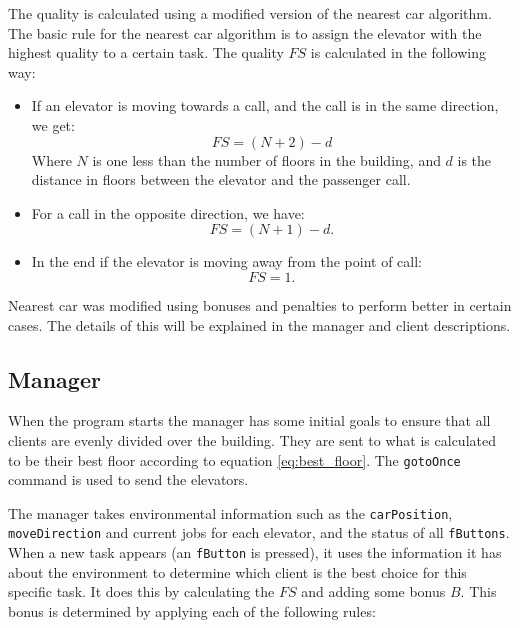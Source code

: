 \documentclass[a4paper,10pt,twocolumn]{article}
\begin{document}
The quality is calculated using a modified version of the nearest car algorithm. The basic rule for the nearest car algorithm is to assign the elevator with the highest quality to a certain task. The quality $FS$ is calculated in the following way:
\begin{itemize}
 \item If an elevator is moving towards a call, and the call is in the same direction, we get:
\begin{equation}
 \label{eq:nearest_car1}
 FS = (N + 2) - d
\end{equation}
 Where $N$ is one less than the number of floors in the building, and $d$ is the distance in floors between the elevator and the passenger call.
 \item For a call in the opposite direction, we have:
\begin{equation}
\label{eq:nearest_car2}
 FS = (N + 1) - d.
\end{equation}
 \item In the end if the elevator is moving away from the point of call: 
 \begin{equation}
 \label{eq:nearest_car3}
  FS = 1.
 \end{equation}
\end{itemize}
Nearest car was modified using bonuses and penalties to perform better in certain cases. The details of this will be explained in the manager and client descriptions.


\subsection{Manager}
When the program starts the manager has some initial goals to ensure that all clients are evenly divided over the building. They are sent to what is calculated to be their best floor according to equation \ref{eq:best_floor}. The \texttt{gotoOnce} command is used to send the elevators.

The manager takes environmental information such as the \texttt{carPosition}, \texttt{moveDirection} and current jobs for each elevator, and the status of all \texttt{fButtons}. When a new task appears (an \texttt{fButton} is pressed), it uses the information it has about the environment to determine which client is the best choice for this specific task. It does this by calculating the $FS$ and adding some bonus $B$. This bonus is determined by applying each of the following rules:
\end{document}
